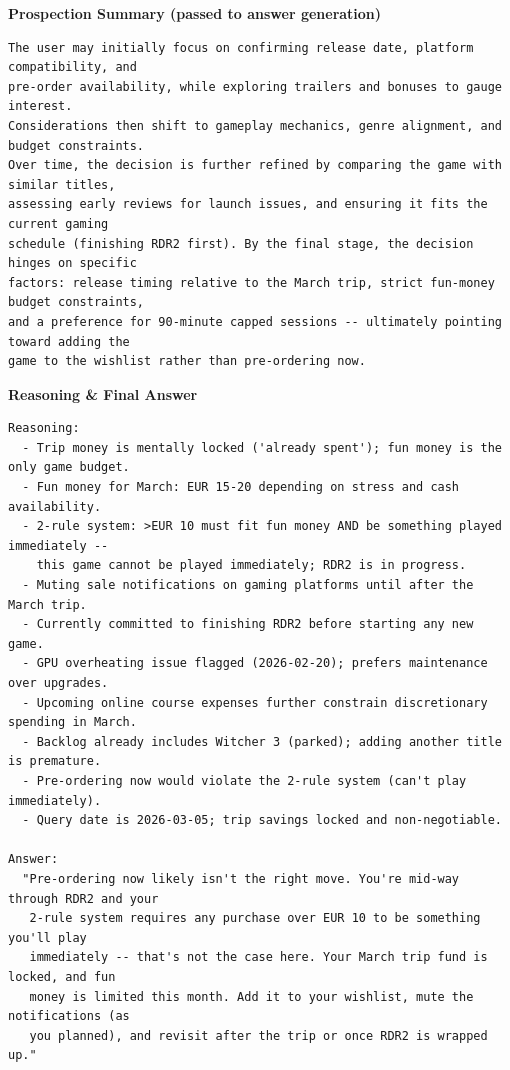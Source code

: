 \vspace{0.5em}
\noindent\textbf{Prospection Summary (passed to answer generation)}
\begin{lstlisting}[style=appendixbox]
The user may initially focus on confirming release date, platform compatibility, and
pre-order availability, while exploring trailers and bonuses to gauge interest.
Considerations then shift to gameplay mechanics, genre alignment, and budget constraints.
Over time, the decision is further refined by comparing the game with similar titles,
assessing early reviews for launch issues, and ensuring it fits the current gaming
schedule (finishing RDR2 first). By the final stage, the decision hinges on specific
factors: release timing relative to the March trip, strict fun-money budget constraints,
and a preference for 90-minute capped sessions -- ultimately pointing toward adding the
game to the wishlist rather than pre-ordering now.
\end{lstlisting}

\vspace{0.5em}
\noindent\textbf{Reasoning \& Final Answer}
\begin{lstlisting}[style=appendixbox]
Reasoning:
  - Trip money is mentally locked ('already spent'); fun money is the only game budget.
  - Fun money for March: EUR 15-20 depending on stress and cash availability.
  - 2-rule system: >EUR 10 must fit fun money AND be something played immediately --
    this game cannot be played immediately; RDR2 is in progress.
  - Muting sale notifications on gaming platforms until after the March trip.
  - Currently committed to finishing RDR2 before starting any new game.
  - GPU overheating issue flagged (2026-02-20); prefers maintenance over upgrades.
  - Upcoming online course expenses further constrain discretionary spending in March.
  - Backlog already includes Witcher 3 (parked); adding another title is premature.
  - Pre-ordering now would violate the 2-rule system (can't play immediately).
  - Query date is 2026-03-05; trip savings locked and non-negotiable.

Answer:
  "Pre-ordering now likely isn't the right move. You're mid-way through RDR2 and your
   2-rule system requires any purchase over EUR 10 to be something you'll play
   immediately -- that's not the case here. Your March trip fund is locked, and fun
   money is limited this month. Add it to your wishlist, mute the notifications (as
   you planned), and revisit after the trip or once RDR2 is wrapped up."
\end{lstlisting}

